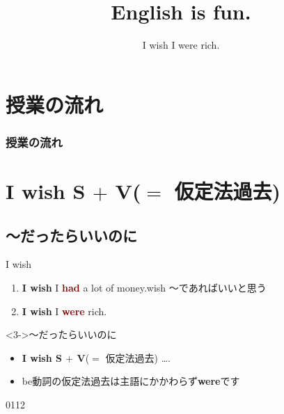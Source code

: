 \documentclass[aspectratio=169,xcolor={dvipsnames,table}]{beamer}
\title{English is fun.}
\subtitle{I wish I were rich.}
\author{}
\institute[]{}
\date[]
\begin{document}
\begin{frame}[plain]
  \titlepage
\end{frame}

\section*{授業の流れ}
\begin{frame}[plain]
  \frametitle{授業の流れ}
  \tableofcontents
\end{frame}

\section{I wish S $+$ V($=$ 仮定法過去)}
\subsection{～だったらいいのに}
\begin{frame}[plain,t]{I wish}
\large
 \begin{enumerate}
  \item<1-> \textbf{I wish} I \textcolor{Maroon}{\bfseries had} a lot of money.\hfill{}{\scriptsize wish ～であればいいと思う}
  \item<2-> \textbf{I wish} I \textcolor{Maroon}{\bfseries were} rich.
\end{enumerate}

\vspace{80pt}

\begin{block}<3->{～だったらいいのに}
\small
\begin{itemize}[square]
 \item {\bfseries I wish S $+$ V}($=$ {\scriptsize 仮定法過去}) \ldots .
 \item be動詞の仮定法過去は主語にかかわらず\textbf{were}です
\end{itemize}
\end{block}

\hfill{\tiny 0112}\,{{\scriptsize {}}} 
\end{frame}
\end{document}
